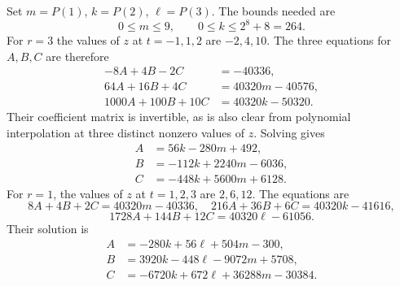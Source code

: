 \documentclass[11pt,reqno,letterpaper]{amsart}
\theoremstyle{definition}
\numberwithin{equation}{section}
\begin{document}
Set $m=P(1)$, $k=P(2)$, $\ell=P(3)$. The bounds needed are
\begin{equation}\label{eq:C8bounds}
 0\le m\le9,\qquad 0\le k\le2^8+8=264.
\end{equation}
For $r=3$ the values of $z$ at $t=-1,1,2$ are $-2,4,10$.
The three equations for $A,B,C$ are therefore
\[
\begin{aligned}
 -8A+4B-2C&=-40336,\\
 64A+16B+4C&=40320m-40576,\\
 1000A+100B+10C&=40320k-50320.
\end{aligned}
\]
Their coefficient matrix is invertible, as is also clear from polynomial
interpolation at three distinct nonzero values of $z$. Solving gives
\begin{equation}\label{eq:C8abc3}
\begin{aligned}
 A&=56k-280m+492,\\
 B&=-112k+2240m-6036,\\
 C&=-448k+5600m+6128.
\end{aligned}
\end{equation}
For $r=1$, the values of $z$ at $t=1,2,3$ are $2,6,12$.
The equations are
\[
 8A+4B+2C=40320m-40336,\quad
 216A+36B+6C=40320k-41616,
\]
\[
 1728A+144B+12C=40320\ell-61056.
\]
Their solution is
\begin{equation}\label{eq:C8abc1}
\begin{aligned}
 A&=-280k+56\ell+504m-300,\\
 B&=3920k-448\ell-9072m+5708,\\
 C&=-6720k+672\ell+36288m-30384.
\end{aligned}
\end{equation}
\end{document}
